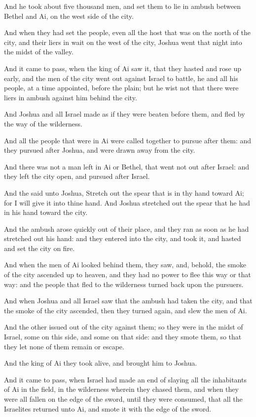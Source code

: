 \verse And he took about five thousand men, and set them to lie in ambush between Bethel and Ai, on the west side of the city.

\verse And when they had set the people, even all the host that was on the north of the city, and their liers in wait on the west of the city, Joshua went that night into the midst of the valley.

\verse And it came to pass, when the king of Ai saw it, that they hasted and rose up early, and the men of the city went out against Israel to battle, he and all his people, at a time appointed, before the plain; but he wist not that there were liers in ambush against him behind the city.

\verse And Joshua and all Israel made as if they were beaten before them, and fled by the way of the wilderness.

\verse And all the people that were in Ai were called together to pursue after them: and they pursued after Joshua, and were drawn away from the city.

\verse And there was not a man left in Ai or Bethel, that went not out after Israel: and they left the city open, and pursued after Israel.

\verse And the \LORD said unto Joshua, Stretch out the spear that is in thy hand toward Ai; for I will give it into thine hand. And Joshua stretched out the spear that he had in his hand toward the city.

\verse And the ambush arose quickly out of their place, and they ran as soon as he had stretched out his hand: and they entered into the city, and took it, and hasted and set the city on fire.

\verse And when the men of Ai looked behind them, they saw, and, behold, the smoke of the city ascended up to heaven, and they had no power to flee this way or that way: and the people that fled to the wilderness turned back upon the pursuers.

\verse And when Joshua and all Israel saw that the ambush had taken the city, and that the smoke of the city ascended, then they turned again, and slew the men of Ai.

\verse And the other issued out of the city against them; so they were in the midst of Israel, some on this side, and some on that side: and they smote them, so that they let none of them remain or escape.

\verse And the king of Ai they took alive, and brought him to Joshua.

\verse And it came to pass, when Israel had made an end of slaying all the inhabitants of Ai in the field, in the wilderness wherein they chased them, and when they were all fallen on the edge of the sword, until they were consumed, that all the Israelites returned unto Ai, and smote it with the edge of the sword.

